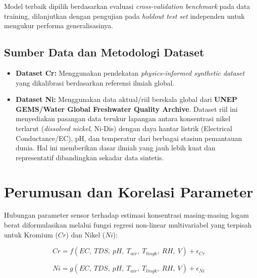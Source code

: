 \documentclass[12pt,a4paper]{article}
\begin{document}
Model terbaik dipilih berdasarkan evaluasi \textit{cross-validation benchmark} pada data training, dilanjutkan dengan pengujian pada \textit{holdout test set} independen untuk mengukur performa generalisasinya.

\subsection{Sumber Data dan Metodologi Dataset}

\begin{itemize}
    \item \textbf{Dataset Cr:} Menggunakan pendekatan \textit{physics-informed synthetic dataset} yang dikalibrasi berdasarkan referensi ilmiah global.
    \item \textbf{Dataset Ni:} Menggunakan data aktual/riil berskala global dari \textbf{UNEP GEMS/Water Global Freshwater Quality Archive}. Dataset riil ini menyediakan pasangan data terukur lapangan antara konsentrasi nikel terlarut (\textit{dissolved nickel}, Ni-Dis) dengan daya hantar listrik (Electrical Conductance/EC), pH, dan temperatur dari berbagai stasiun pemantauan dunia. Hal ini memberikan dasar ilmiah yang jauh lebih kuat dan representatif dibandingkan sekadar data sintetis.
\end{itemize}


\section{Perumusan dan Korelasi Parameter}

Hubungan parameter sensor terhadap estimasi konsentrasi masing-masing logam berat diformulasikan melalui fungsi regresi non-linear multivariabel yang terpisah untuk Kromium ($Cr$) dan Nikel ($Ni$):

\begin{equation}
Cr = f(EC,\ TDS,\ pH,\ T_{air},\ T_{lingk},\ RH,\ V) + \epsilon_{Cr}
\end{equation}

\begin{equation}
Ni = g(EC,\ TDS,\ pH,\ T_{air},\ T_{lingk},\ RH,\ V) + \epsilon_{Ni}
\end{equation}
\end{document}
